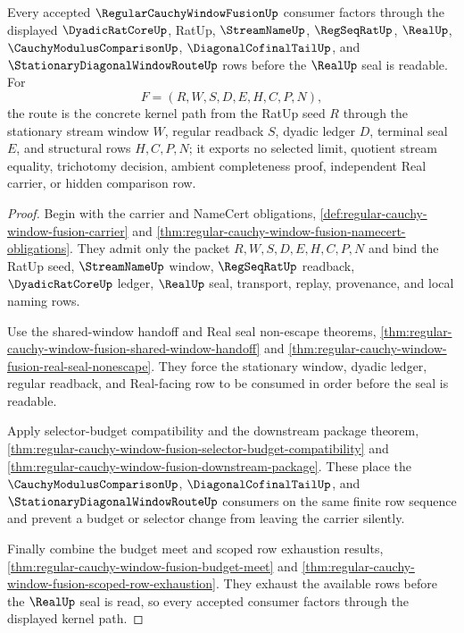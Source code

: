 \begin{theorem}
\label{thm:regular-cauchy-window-fusion-scoped-route}
Every accepted $\RegularCauchyWindowFusionUp$ consumer factors through the displayed $\DyadicRatCoreUp$, RatUp, $\StreamNameUp$, $\RegSeqRatUp$, $\RealUp$, $\CauchyModulusComparisonUp$, $\DiagonalCofinalTailUp$, and $\StationaryDiagonalWindowRouteUp$ rows before the $\RealUp$ seal is readable. For
$$
F=(R,W,S,D,E,H,C,P,N),
$$
the route is the concrete kernel path from the RatUp seed $R$ through the stationary stream window $W$, regular readback $S$, dyadic ledger $D$, terminal seal $E$, and structural rows $H,C,P,N$; it exports no selected limit, quotient stream equality, trichotomy decision, ambient completeness proof, independent Real carrier, or hidden comparison row.
\end{theorem}
\begin{proof}
Begin with the carrier and NameCert obligations, \autoref{def:regular-cauchy-window-fusion-carrier} and \autoref{thm:regular-cauchy-window-fusion-namecert-obligations}. They admit only the packet $R,W,S,D,E,H,C,P,N$ and bind the RatUp seed, $\StreamNameUp$ window, $\RegSeqRatUp$ readback, $\DyadicRatCoreUp$ ledger, $\RealUp$ seal, transport, replay, provenance, and local naming rows.

Use the shared-window handoff and Real seal non-escape theorems, \autoref{thm:regular-cauchy-window-fusion-shared-window-handoff} and \autoref{thm:regular-cauchy-window-fusion-real-seal-nonescape}. They force the stationary window, dyadic ledger, regular readback, and Real-facing row to be consumed in order before the seal is readable.

Apply selector-budget compatibility and the downstream package theorem, \autoref{thm:regular-cauchy-window-fusion-selector-budget-compatibility} and \autoref{thm:regular-cauchy-window-fusion-downstream-package}. These place the $\CauchyModulusComparisonUp$, $\DiagonalCofinalTailUp$, and $\StationaryDiagonalWindowRouteUp$ consumers on the same finite row sequence and prevent a budget or selector change from leaving the carrier silently.

Finally combine the budget meet and scoped row exhaustion results, \autoref{thm:regular-cauchy-window-fusion-budget-meet} and \autoref{thm:regular-cauchy-window-fusion-scoped-row-exhaustion}. They exhaust the available rows before the $\RealUp$ seal is read, so every accepted consumer factors through the displayed kernel path.
\end{proof}

